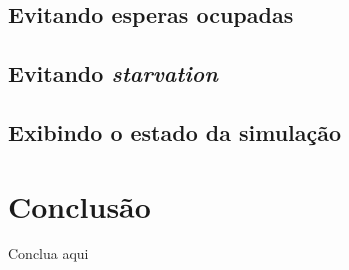 \documentclass[a4paper]{article}
\begin{document}
\subsection{Evitando esperas ocupadas}
\label{sec:avoidBusyWaits}

\subsection{Evitando \textit{starvation}}
\label{sec:avoidStarvation}

\subsection{Exibindo o estado da simulação}
\label{sec:showProgramState}

\section{Conclusão}

Conclua aqui

\printbibliography
\end{document}
